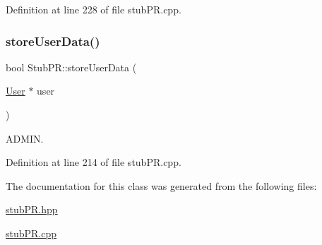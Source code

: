 Definition at line 228 of file stub\+P\+R.\+cpp.

\mbox{\label{class_stub_p_r_ada02f504375eb2d769687fd33c520db1}} 
\subsubsection{\texorpdfstring{store\+User\+Data()}{storeUserData()}}
{\footnotesize\ttfamily bool Stub\+P\+R\+::store\+User\+Data (\begin{DoxyParamCaption}\item[{\hyperlink{class_user}{User} $\ast$}]{user }\end{DoxyParamCaption})}



A\+D\+M\+IN. 



Definition at line 214 of file stub\+P\+R.\+cpp.



The documentation for this class was generated from the following files\+:\begin{DoxyCompactItemize}
\item 
\hyperlink{stub_p_r_8hpp}{stub\+P\+R.\+hpp}\item 
\hyperlink{stub_p_r_8cpp}{stub\+P\+R.\+cpp}\end{DoxyCompactItemize}
